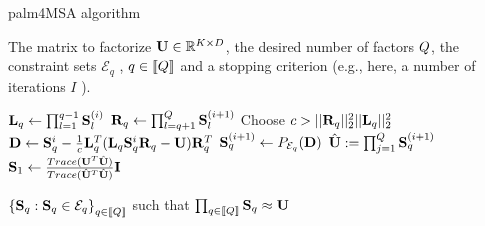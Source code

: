 \begin{algorithm}
	\caption{palm4MSA algorithm}
	\label{algo:palm4msa}
	\begin{algorithmic}[1]
		
		\REQUIRE The matrix to factorize ${\mathbf{U}} \in \mathbb{R}^{K \times D}$, the desired number of factors $Q$, the constraint sets $\mathcal{E}_q$ , $q\in \left \llbracket Q\right \rrbracket$ and a stopping criterion (e.g., here, a number of iterations $I$ ).
		
		
		\STATE  ${\mathbf{L}}_q \leftarrow \prod_{l=1}^{q-1} {\mathbf{S}}_{l}^{(i)}$
		\hfill {}
		\STATE  ${\mathbf{R}}_q \leftarrow \prod_{l=q+1}^{Q} {\mathbf{S}}_{l}^{(i+1)}$
		\hfill {}
		\STATE Choose $c > ||{\mathbf{R}}_q||_2^2 ||{\mathbf{L}}_q||_2^2$
		\hfill {}
		\STATE ${\mathbf{D}} \leftarrow {\mathbf{S}}_q^i - \frac{1}{c} {\mathbf{L}}_q^T({\mathbf{L}}_q {\mathbf{S}}_q^i {\mathbf{R}}_q - {\mathbf{U}}){\mathbf{R}}_q^T$
		\STATE ${\mathbf{S}}^{(i+1)}_q \leftarrow P_{\mathcal{E}_q}({\mathbf{D}})$
		\hfill {}
		\ENDFOR
		\STATE $\hat {{\mathbf{U}}} := \prod_{j=1}^{Q} {\mathbf{S}}_q^{(i+1)}$
		\hfill {}
		\STATE ${\mathbf{S}}_1 \leftarrow \frac{Trace({\mathbf{U}}^T\hat{{\mathbf{U}}})}{Trace(\hat{{\mathbf{U}}}^T\hat{{\mathbf{U}}})} {\mathbf{I}}$
		\hfill {}
		\ENDFOR
		
		\ENSURE $\left \lbrace {\mathbf{S}}_q : {\mathbf{S}}_q \in \mathcal{E}_q\right \rbrace_{q\in\left \llbracket Q\right \rrbracket}$ such that $\prod_{q\in\left \llbracket Q\right \rrbracket}{\mathbf{S}}_q \approx {\mathbf{U}}$
		
	\end{algorithmic}
\end{algorithm}


